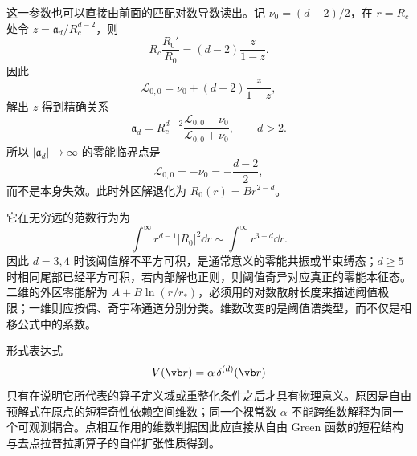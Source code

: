 这一参数也可以直接由前面的匹配对数导数读出。记 $\nu_0=(d-2)/2$，在 $r=R_c$ 处令 $z=\mathfrak a_d/R_c^{d-2}$，则
\[
R_c\frac{R_0'}{R_0}
=(d-2)\frac{z}{1-z}.
\]
因此
\[
\mathcal L_{0,0}
=\nu_0+(d-2)\frac{z}{1-z},
\]
解出 $z$ 得到精确关系
\begin{equation}
\mathfrak a_d
=R_c^{d-2}
\frac{\mathcal L_{0,0}-\nu_0}
{\mathcal L_{0,0}+\nu_0},
\qquad d>2.
\label{eq:phys-hdqm-scattering-length-logderivative}
\end{equation}
所以 $|\mathfrak a_d|\to\infty$ 的零能临界点是
\begin{equation}
\mathcal L_{0,0}=-\nu_0=-\frac{d-2}{2},
\label{eq:phys-hdqm-zero-resonance-matching}
\end{equation}
而不是本身失效。此时外区解退化为 $R_0(r)=B r^{2-d}$。

它在无穷远的范数行为为
\[
\int^\infty r^{d-1}|R_0|^2\dd r
\sim\int^\infty r^{3-d}\dd r.
\]
因此 $d=3,4$ 时该阈值解不平方可积，是通常意义的零能共振或半束缚态；$d\ge5$ 时相同尾部已经平方可积，若内部解也正则，则阈值奇异对应真正的零能本征态。二维的外区零能解为 $A+B\ln(r/r_*)$，必须用的对数散射长度来描述阈值极限；一维则应按偶、奇宇称通道分别分类。维数改变的是阈值谱类型，而不仅是相移公式中的系数。

\label{sec:phys-hdqm-point-interactions}

形式表达式
\begin{equation}
V(\vb r)=\alpha\,\delta^{(d)}(\vb r)
\label{eq:phys-hdqm-delta-potential}
\end{equation}
只有在说明它所代表的算子定义域或重整化条件之后才具有物理意义。原因是自由预解式在原点的短程奇性依赖空间维数；同一个裸常数 $\alpha$ 不能跨维数解释为同一个可观测耦合。点相互作用的维数判据因此应直接从自由 Green 函数的短程结构与去点拉普拉斯算子的自伴扩张性质得到。

